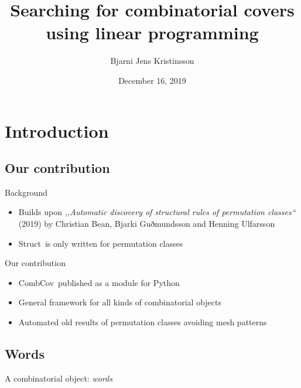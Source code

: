 \documentclass[icelandic]{beamer}
\title[Combinatorial covers]{Searching for combinatorial covers using linear programming}
\author[Bjarni Jens, Christian and Henning]{Bjarni Jens Kristinsson}
\institute{Reykjavik University}
\date{December 16, 2019}
\newtheorem*{research questions}{Research questions}
\newcommand{\Struct}{\textsf{Struct}}
\newcommand{\CombCov}{\textsf{CombCov}}
\begin{document}
\begin{frame}\titlepage\end{frame}
\begin{frame}\tableofcontents\end{frame}


\section{Introduction}
\subsection{Our contribution}
\begin{frame}{Background}
  \begin{itemize}
    \item Builds upon \emph{,,Automatic discovery of structural rules of permutation classes``} (2019) by Christian Bean, Bjarki Guðmundsson and Henning Ulfarsson
    \item \Struct\ is only written for permutation classes
  \end{itemize}
\end{frame}

\begin{frame}{Our contribution}
\begin{itemize}
  \item \CombCov\ published as a module for Python
  \item General framework for all kinds of combinatorial objects
  \item Automated old results of permutation classes avoiding mesh patterns
\end{itemize}
\end{frame}


\subsection{Words}
\begin{frame}{A combinatorial object: \emph{words}}
\end{frame}
\end{document}
